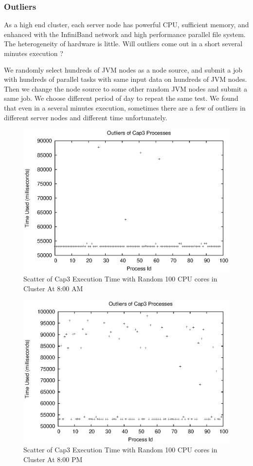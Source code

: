 \subsubsection{Outliers}
As a high end cluster, each server node has powerful CPU, sufficient memory, and enhanced with the InfiniBand network and high performance parallel file system. The heterogeneity of hardware is little. Will outliers come out in a short several minutes execution ?

We randomly select hundreds of JVM nodes as a node source, and submit a job with hundreds of parallel tasks with same input data on hundreds of JVM nodes. Then we change the node source to some other random JVM nodes and submit a same job. We choose different period of day to repeat the same test. We found that even in a several minutes execution, sometimes there are a few of outliers in different server nodes and different time unfortunately.

\begin{figure}
\centering
\includegraphics[width=0.9\columnwidth]{figures/outliers.eps}
\caption{Scatter of Cap3 Execution Time with Random 100 CPU cores in Cluster At 8:00 AM}
\label{figure:outlier}
\end{figure}

\begin{figure}
\centering
\includegraphics[width=0.9\columnwidth]{figures/yaoutliers.eps}
\caption{Scatter of Cap3 Execution Time with Random 100 CPU cores in Cluster At 8:00 PM}
\label{figure:yaoutlier}
\end{figure}

